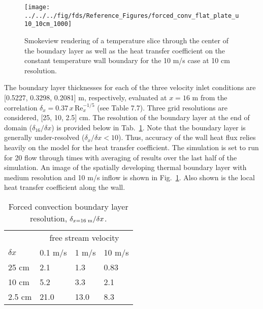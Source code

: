\documentclass[11pt]{book}
\begin{document}
\begin{figure}[h]
   \centering
   \texttt{[image: ../../../fig/fds/Reference\_Figures/forced\_conv\_flat\_plate\_u10\_10cm\_1000]}
   \caption[Forced convection flat plate boundary layer]{\label{fig_forced_conv_image} Smokeview rendering of a temperature slice through the center of the boundary layer as well as the heat transfer coefficient on the constant temperature wall boundary for the 10 m/s case at 10 cm resolution.}
\end{figure}

The boundary layer thicknesses for each of the three velocity inlet conditions are [0.5227, 0.3298, 0.2081] m, respectively, evaluated at $x=16$ m from the correlation $\delta_x = 0.37\,x\,\mbox{Re}_x^{-1/5}$ (see \cite{Incropera:1} Table 7.7).  Three grid resolutions are considered, [25, 10, 2.5] cm.  The resolution of the boundary layer at the end of domain ($\delta_{16}/\delta x$) is provided below in Tab.~\ref{tab:bl_resolution}. Note that the boundary layer is generally under-resolved ($\delta_x/\delta x<10$).  Thus, accuracy of the wall heat flux relies heavily on the model for the heat transfer coefficient.  The simulation is set to run for 20 flow through times with averaging of results over the last half of the simulation.  An image of the spatially developing thermal boundary layer with medium resolution and 10 m/s inflow is shown in Fig.~\ref{fig_forced_conv_image}.  Also shown is the local heat transfer coefficient along the wall.

\begin{table}[h]
\centering
\caption[Forced convection boundary layer resolution]{Forced convection boundary layer resolution, $\delta_{x=16\;\mbox{\scriptsize m}}/\delta x$.}
\label{tab:bl_resolution}
\begin{tabular}{l|lll}
           & \multicolumn{3}{c}{free stream velocity} \\
$\delta x$ & 0.1 m/s & 1 m/s & 10 m/s \\
\hline
25 cm    & 2.1  & 1.3   & 0.83 \\
10 cm    & 5.2  & 3.3   & 2.1  \\
2.5 cm   & 21.0 & 13.0  & 8.3
\end{tabular}
\end{table}
\end{document}
